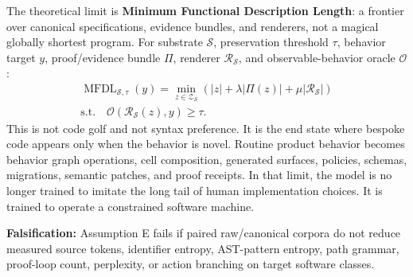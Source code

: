 The theoretical limit is \textbf{Minimum Functional Description Length}: a frontier over canonical specifications, evidence bundles, and renderers, not a magical globally shortest program. For substrate $\mathcal{S}$, preservation threshold $\tau$, behavior target $y$, proof/evidence bundle $\Pi$, renderer $\mathcal{R}_{\mathcal{S}}$, and observable-behavior oracle $\mathcal{O}$:
\begin{multline}
\operatorname{MFDL}_{\mathcal{S},\tau}(y)=
\min_{z\in\mathcal{Z}_{\mathcal{S}}}
\left(|z|+\lambda|\Pi(z)|+\mu|\mathcal{R}_{\mathcal{S}}|\right)\\
\text{s.t.}\quad
\mathcal{O}(\mathcal{R}_{\mathcal{S}}(z),y)\ge\tau.
\end{multline}
This is not code golf and not syntax preference. It is the end state where bespoke code appears only when the behavior is novel. Routine product behavior becomes behavior graph operations, cell composition, generated surfaces, policies, schemas, migrations, semantic patches, and proof receipts. In that limit, the model is no longer trained to imitate the long tail of human implementation choices. It is trained to operate a constrained software machine.

\textbf{Falsification:} Assumption E fails if paired raw/canonical corpora do not reduce measured source tokens, identifier entropy, AST-pattern entropy, path grammar, proof-loop count, perplexity, or action branching on target software classes.

